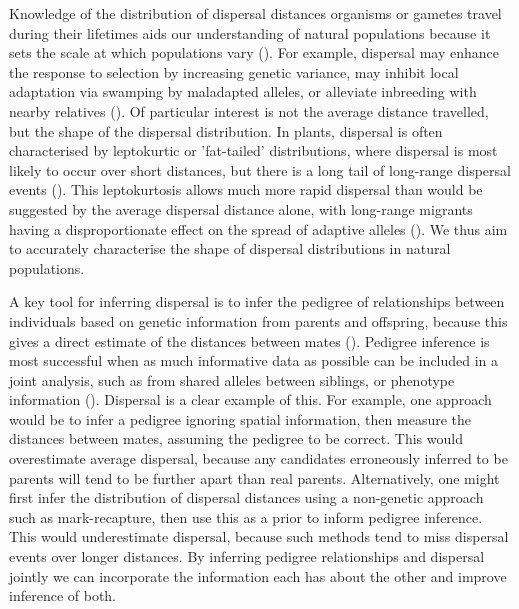 \documentclass[10pt, a4paper, twocolumn]{article} %
\begin{document}
Knowledge of the distribution of dispersal distances organisms or gametes travel during their lifetimes aids our understanding of natural populations because it sets the scale at which populations vary (\cite{cain2000long}).
For example, dispersal may enhance the response to selection by increasing genetic variance, may inhibit local adaptation via swamping by maladapted alleles, or alleviate inbreeding with nearby relatives (\cite{kremer2012long}).
Of particular interest is not the average distance travelled, but the shape of the dispersal distribution.
In plants, dispersal is often characterised by leptokurtic or 'fat-tailed' distributions, where dispersal is most likely to occur over short distances, but there is a long tail of long-range dispersal events (\cite{clark1998trees,austerlitz2004using,bullock2017synthesis}).
This leptokurtosis allows much more rapid dispersal than would be suggested by the average dispersal distance alone, with long-range migrants having a disproportionate effect on the spread of adaptive alleles (\cite{clark1998trees,cain2000long}).
We thus aim to accurately characterise the shape of dispersal distributions in natural populations.

A key tool for inferring dispersal is to infer the pedigree of relationships between individuals based on genetic information from parents and offspring, because this gives a direct estimate of the distances between mates (\cite{adams1992using, cain2000long, austerlitz2004using,pemberton2008wild}).
Pedigree inference is most successful when as much informative data as possible can be included in a joint analysis, such as from shared alleles between siblings, or phenotype information (\cite{neff2001bayesian, wang2007parentage}).
Dispersal is a clear example of this.
For example, one approach would be to infer a pedigree ignoring spatial information, then measure the distances between mates, assuming the pedigree to be correct.
This would overestimate average dispersal, because any candidates erroneously inferred to be parents will tend to be further apart than real parents.
Alternatively, one might first infer the distribution of dispersal distances using a non-genetic approach such as mark-recapture, then use this as a prior to inform pedigree inference.
This would underestimate dispersal, because such methods tend to miss dispersal events over longer distances.
By inferring pedigree relationships and dispersal jointly we can incorporate the information each has about the other and improve inference of both.
\end{document}
